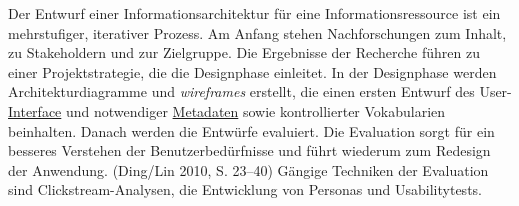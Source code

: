 \documentclass{article}
\begin{document}
        Der Entwurf einer Informationsarchitektur für eine Informationsressource ist ein
                  mehrstufiger, iterativer Prozess. Am Anfang stehen Nachforschungen zum Inhalt, zu
                  Stakeholdern und zur Zielgruppe. Die Ergebnisse der Recherche führen zu einer
                  Projektstrategie, die die Designphase einleitet. In der Designphase werden
                  Architekturdiagramme und \emph{wireframes} erstellt, die einen
                  ersten Entwurf des User-\href{http://gams.uni-graz.at/o:konde.99}{Interface}
                  und notwendiger \href{http://gams.uni-graz.at/o:konde.25}{Metadaten} sowie
                  kontrollierter Vokabularien beinhalten. Danach werden die Entwürfe evaluiert. Die
                  Evaluation sorgt für ein besseres Verstehen der Benutzerbedürfnisse und führt
                  wiederum zum Redesign der Anwendung. (Ding/Lin 2010, S. 23–40)
                  Gängige Techniken der Evaluation sind Clickstream-Analysen, die Entwicklung von
                  Personas und Usabilitytests.\\
            
\end{document}
